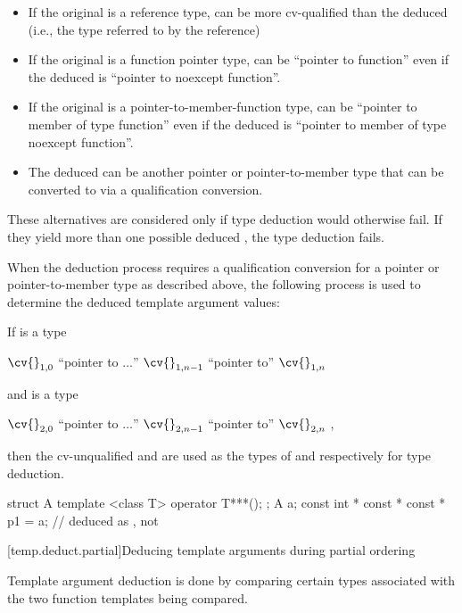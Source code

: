 \begin{itemize}
\item
If the original  is a reference type,
 can be more cv-qualified than the deduced 
(i.e., the type referred to by the reference)
\item
If the original  is a function pointer type,
 can be ``pointer to function''
even if the deduced  is ``pointer to noexcept function''.
\item
If the original  is a pointer-to-member-function type,
 can be ``pointer to member of type function''
even if the deduced  is ``pointer to member of type noexcept function''.
\item
The deduced 
can be another pointer or pointer-to-member type that
can be converted to  via a qualification conversion.
\end{itemize}

\pnum
These alternatives are considered only if type deduction would
otherwise fail.
If they yield more than one possible deduced
,
the type deduction fails.

\pnum
When the deduction process requires a qualification conversion for a
pointer or pointer-to-member type as described above, the following
process is used to determine the deduced template argument values:

If
is a type
\begin{indented}
$\cv{}_{1,0}$ ``pointer to $\ldots$'' $\cv{}_{1,n-1}$ ``pointer to''
$\cv{}_{1,n}$ 
\end{indented}
and
is a type
\begin{indented}
$\cv{}_{2,0}$ ``pointer to $\ldots$'' $\cv{}_{2,n-1}$ ``pointer to''
$\cv{}_{2,n}$ ,
\end{indented}
then the cv-unqualified
and
are used as the types of
and
respectively for type deduction.
\begin{example}
\begin{codeblock}
struct A {
  template <class T> operator T***();
};
A a;
const int * const * const * p1 = a;     //  deduced as , not 
\end{codeblock}
\end{example}

[temp.deduct.partial]{Deducing template arguments during partial ordering}

\pnum
Template argument deduction is done by comparing certain types associated with
the two function templates being compared.

